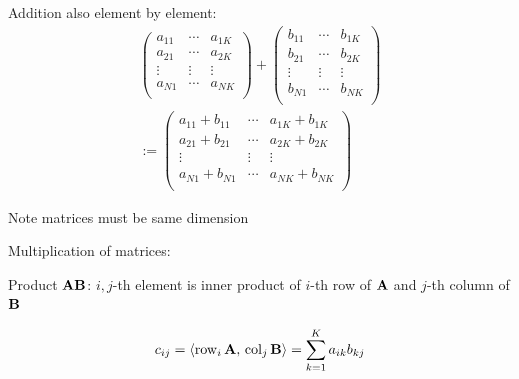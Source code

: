 \begin{frame}
    
    \vspace{2em}
    Addition also element by element:
    \begin{multline*}
        \left(
        \begin{array}{ccc}
            a_{11} & \cdots & a_{1K} \\
            a_{21} & \cdots & a_{2K} \\
            \vdots & \vdots & \vdots \\
            a_{N1} & \cdots & a_{NK} \\
        \end{array}
        \right)
        +
        \left(
        \begin{array}{ccc}
            b_{11} & \cdots & b_{1K} \\
            b_{21} & \cdots & b_{2K} \\
            \vdots & \vdots & \vdots \\
            b_{N1} & \cdots & b_{NK} \\
        \end{array}
        \right)
        \\
        :=
        \left(
        \begin{array}{ccc}
            a_{11} + b_{11} &  \cdots & a_{1K} + b_{1K} \\
            a_{21} + b_{21} &  \cdots & a_{2K} + b_{2K} \\
            \vdots & \vdots & \vdots \\
            a_{N1} + b_{N1} &  \cdots & a_{NK} + b_{NK} \\
        \end{array}
        \right)
    \end{multline*}

    Note  matrices must be same dimension

\end{frame}

\begin{frame}
    
    \vspace{2em}
    Multiplication of matrices:  
    
    \vspace{.7em}
    Product $\mathbf A \mathbf B$: 
    $i,j$-th element is inner product of $i$-th row of $\mathbf A$ and 
    $j$-th column of $\mathbf B$  
    
    \begin{equation*}
    c_{ij} = \left\langle{\operatorname{row}_i \mathbf A,\,  \operatorname{col}_j  \mathbf B}\right\rangle = \sum_{k=1}^K a_{ik} b_{kj}
    \end{equation*}
\end{frame}




